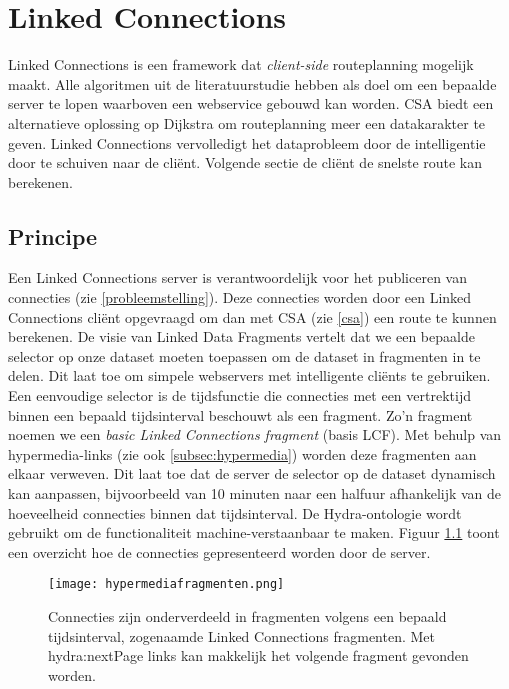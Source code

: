 \chapter{Linked Connections}
\label{lc}

Linked Connections \cite{colpaert_iswc_2015} is een framework dat \textit{client-side} routeplanning mogelijk maakt. Alle algoritmen uit de literatuurstudie hebben als doel om een bepaalde server te lopen  waarboven een webservice gebouwd kan worden. CSA biedt een alternatieve oplossing op Dijkstra om routeplanning meer een datakarakter te geven. Linked Connections vervolledigt het dataprobleem door de intelligentie door te schuiven naar de cli\"ent. Volgende sectie de cli\"ent de snelste route kan berekenen.

\section{Principe}

Een Linked Connections server is verantwoordelijk voor het publiceren van connecties (zie \ref{probleemstelling}). Deze connecties worden door een Linked Connections cli\"ent opgevraagd om dan met CSA (zie \ref{csa}) een route te kunnen berekenen. De visie van Linked Data Fragments vertelt dat we een bepaalde selector op onze dataset moeten toepassen om de dataset in fragmenten in te delen. Dit laat toe om simpele webservers met intelligente cli\"ents te gebruiken. Een eenvoudige selector is de tijdsfunctie die connecties met een vertrektijd binnen een bepaald tijdsinterval beschouwt als een fragment. Zo'n fragment noemen we een \textit{basic Linked Connections fragment} (basis LCF). Met behulp van hypermedia-links (zie ook \ref{subsec:hypermedia}) worden deze fragmenten aan elkaar verweven. Dit laat toe dat de server de selector op de dataset dynamisch kan aanpassen, bijvoorbeeld van 10 minuten naar een halfuur afhankelijk van de hoeveelheid connecties binnen dat tijdsinterval. De Hydra-ontologie wordt gebruikt om de functionaliteit machine-verstaanbaar te maken. Figuur \ref{lcfragm} toont een overzicht hoe de connecties gepresenteerd worden door de server.

\begin{figure}[h!]
\centering
\texttt{[image: hypermediafragmenten.png]}
\caption{Connecties zijn onderverdeeld in fragmenten volgens een bepaald tijdsinterval, zogenaamde Linked Connections fragmenten. Met hydra:nextPage links kan makkelijk het volgende fragment gevonden worden.}
\label{lcfragm}
\end{figure}

